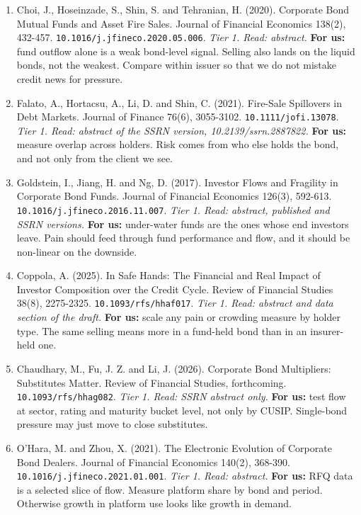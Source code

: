 \begin{enumerate}[leftmargin=*,itemsep=3pt]
\item Choi, J., Hoseinzade, S., Shin, S. and Tehranian, H. (2020). Corporate Bond Mutual Funds and Asset Fire Sales. Journal of Financial Economics 138(2), 432-457. \nolinkurl{10.1016/j.jfineco.2020.05.006}. \emph{Tier 1. Read: abstract.} \textbf{For us:} fund outflow alone is a weak bond-level signal. Selling also lands on the liquid bonds, not the weakest. Compare within issuer so that we do not mistake credit news for pressure.
\item Falato, A., Hortacsu, A., Li, D. and Shin, C. (2021). Fire-Sale Spillovers in Debt Markets. Journal of Finance 76(6), 3055-3102. \nolinkurl{10.1111/jofi.13078}. \emph{Tier 1. Read: abstract of the SSRN version, 10.2139/ssrn.2887822.} \textbf{For us:} measure overlap across holders. Risk comes from who else holds the bond, and not only from the client we see.
\item Goldstein, I., Jiang, H. and Ng, D. (2017). Investor Flows and Fragility in Corporate Bond Funds. Journal of Financial Economics 126(3), 592-613. \nolinkurl{10.1016/j.jfineco.2016.11.007}. \emph{Tier 1. Read: abstract, published and SSRN versions.} \textbf{For us:} under-water funds are the ones whose end investors leave. Pain should feed through fund performance and flow, and it should be non-linear on the downside.
\item Coppola, A. (2025). In Safe Hands: The Financial and Real Impact of Investor Composition over the Credit Cycle. Review of Financial Studies 38(8), 2275-2325. \nolinkurl{10.1093/rfs/hhaf017}. \emph{Tier 1. Read: abstract and data section of the draft.} \textbf{For us:} scale any pain or crowding measure by holder type. The same selling means more in a fund-held bond than in an insurer-held one.
\item Chaudhary, M., Fu, J. Z. and Li, J. (2026). Corporate Bond Multipliers: Substitutes Matter. Review of Financial Studies, forthcoming. \nolinkurl{10.1093/rfs/hhag082}. \emph{Tier 1. Read: SSRN abstract only.} \textbf{For us:} test flow at sector, rating and maturity bucket level, not only by CUSIP. Single-bond pressure may just move to close substitutes.
\item O'Hara, M. and Zhou, X. (2021). The Electronic Evolution of Corporate Bond Dealers. Journal of Financial Economics 140(2), 368-390. \nolinkurl{10.1016/j.jfineco.2021.01.001}. \emph{Tier 1. Read: abstract.} \textbf{For us:} RFQ data is a selected slice of flow. Measure platform share by bond and period. Otherwise growth in platform use looks like growth in demand.

\end{enumerate}
